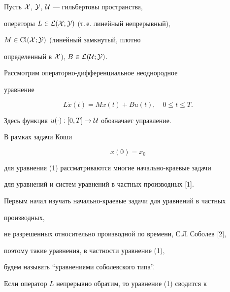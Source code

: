 

\maketitle


\label{begin}








Пусть $\cal X$, $\cal Y$, $\cal U$ --- гильбертовы пространства,


операторы $L\in \cal L(\cal X;\cal Y)$ (т.\,е. линейный непрерывный),


$M\in\operatorname{Cl} (\cal X;\cal Y)$ (линейный замкнутый, плотно


определенный в ${\cal X}$), $B\in \cal L(\cal U;\cal Y)$.


Рассмотрим операторно-дифференциальное неоднородное


уравнение


\begin{equation}


L\Dot x(t)=Mx(t)+Bu(t), \quad 0\le{t}\le{T}.


\end{equation}


Здесь функция $u(\cdot):[0,T]\to{\cal U}$ обозначает управление.





В рамках задачи Коши


\begin{equation}


x(0)=x_0


\end{equation}


для уравнения (1) рассматриваются многие начально-краевые задачи


для уравнений и систем уравнений в частных производных [1].


Первым начал изучать начально-краевые задачи для уравнений в частных


производных,


не разрешенных относительно производной по времени, С.Л.\,Соболев [2],


поэтому такие уравнения, в частности уравнение (1), 


будем называть ``уравнениями соболевского типа''.





Если оператор $L$ непрерывно обратим, то уравнение (1) сводится к


